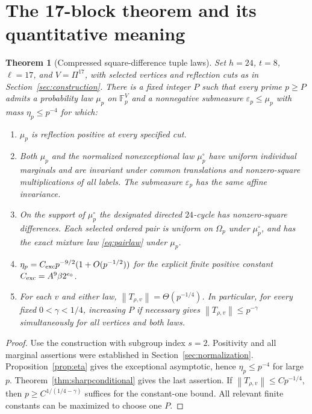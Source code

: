 \documentclass[11pt,a4paper]{article}
\numberwithin{equation}{section}
\newtheorem{theorem}{Theorem}[section]
\theoremstyle{definition}
\theoremstyle{remark}
\newcommand{\F}{\mathbb F}
\newcommand{\norm}[1]{\left\lVert #1\right\rVert}
\begin{document}
\section{The 17-block theorem and its quantitative meaning}
\label{sec:17blocks}

\begin{theorem}[Compressed square-difference tuple laws]
\label{thm:compressed}
Set $h=24$, $t=8$, $\ell=17$, and $V=\Pi^{17}$, with selected vertices
and reflection cuts as in Section~\ref{sec:construction}. There is a
fixed integer $P$ such that every prime $p\ge P$ admits a probability
law $\mu_p$ on $\F_p^V$ and a nonnegative submeasure
$\varepsilon_p\le\mu_p$ with mass $\eta_p\le p^{-4}$ for which:
\begin{enumerate}
\item $\mu_p$ is reflection positive at every specified cut.
\item Both $\mu_p$ and the normalized nonexceptional law $\mu_p^\circ$
      have uniform individual marginals and are invariant under common
      translations and nonzero-square multiplications of all labels.
      The submeasure $\varepsilon_p$ has the same affine invariance.
\item On the support of $\mu_p^\circ$ the designated directed
      $24$-cycle has nonzero-square differences. Each selected ordered
      pair is uniform on $\Omega_p$ under $\mu_p^\circ$, and has
      the exact mixture law \eqref{eq:pairlaw} under $\mu_p$.
\item $\eta_p=C_{\rm exc}p^{-9/2}(1+O(p^{-1/2}))$ for the explicit
      finite positive constant $C_{\rm exc}=A^9\beta2^{e_0}$.
\item For each $v$ and either law,
      $\norm{T_{\rho,v}}=\Theta(p^{-1/4})$. In particular, for every
      fixed $0<\gamma<1/4$, increasing $P$ if necessary gives
      $\norm{T_{\rho,v}}\le p^{-\gamma}$ simultaneously for all
      vertices and both laws.
\end{enumerate}
\end{theorem}
\begin{proof}
Use the construction with subgroup index $s=2$. Positivity and all
marginal assertions were established in Section~\ref{sec:normalization}.
Proposition~\ref{prop:eta} gives the exceptional asymptotic, hence
$\eta_p\le p^{-4}$ for large $p$. Theorem~\ref{thm:sharpconditional}
gives the last assertion. If $\norm{T_{\rho,v}}\le C p^{-1/4}$,
then $p\ge C^{1/(1/4-\gamma)}$ suffices for the constant-one bound.
All relevant finite constants can be maximized to choose one $P$.
\end{proof}
\end{document}
